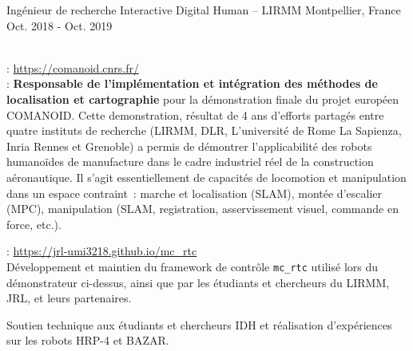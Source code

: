 \begin{cventries}
  \cventry
    {Ingénieur de recherche} %
    {Interactive Digital Human -- LIRMM} %
    {Montpellier, France} %
    {Oct. 2018 - Oct. 2019} %
    {
      \begin{cvitems} %
        \item {}\\
          : \url{https://comanoid.cnrs.fr/}\\
          : \textbf{Responsable de l'implémentation et intégration des méthodes de localisation et cartographie} pour la démonstration finale du projet européen COMANOID. Cette demonstration, résultat de 4 ans d'efforts partagés entre quatre instituts de recherche (LIRMM, DLR, L'université de Rome La Sapienza, Inria Rennes et Grenoble) a permis de démontrer l'applicabilité des robots humanoïdes de manufacture dans le cadre industriel réel de la construction aéronautique. Il s'agit essentiellement de capacités de locomotion et manipulation dans un espace contraint~: marche et localisation (SLAM), montée d’escalier (MPC), manipulation (SLAM, registration, asservissement visuel, commande en force, etc.).
        \item {}: \url{https://jrl-umi3218.github.io/mc_rtc}\\
        Développement et maintien du framework de contrôle {\tt mc\_rtc} utilisé lors du  démonstrateur ci-dessus, ainsi que par les étudiants et chercheurs du LIRMM, JRL, et leurs partenaires.
        \item Soutien technique aux étudiants et chercheurs IDH et réalisation d'expériences sur les robots HRP-4 et BAZAR.
      \end{cvitems}
    }


\end{cventries}
